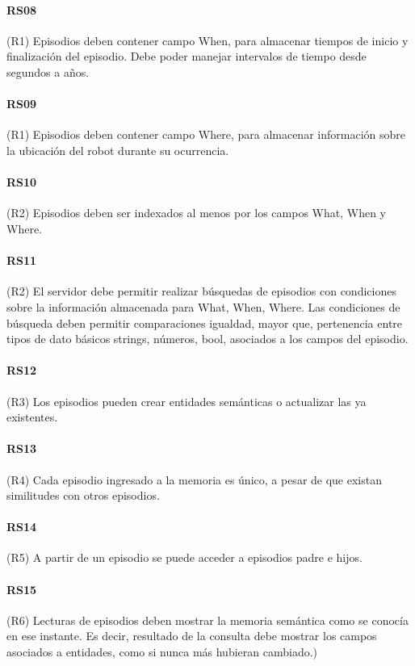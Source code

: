 \paragraph{RS08}
(R1) Episodios deben contener campo When, para almacenar tiempos de inicio y finalización del episodio. Debe poder manejar intervalos de tiempo desde segundos a años.

\paragraph{RS09}
(R1) Episodios deben contener campo Where, para almacenar información sobre la ubicación del robot durante su ocurrencia.

\paragraph{RS10}
(R2) Episodios deben ser indexados al menos por los campos What, When y Where.

\paragraph{RS11}
(R2) El servidor debe permitir realizar búsquedas de episodios con condiciones sobre la información almacenada para What, When, Where. Las condiciones de búsqueda deben permitir comparaciones {igualdad, mayor que, pertenencia} entre tipos de dato básicos {strings, números, bool}, asociados a los campos del episodio.

\paragraph{RS12}
(R3) Los episodios pueden crear entidades semánticas o actualizar las ya existentes.

\paragraph{RS13}
(R4)  Cada episodio ingresado a la memoria es único, a pesar de que existan similitudes con otros episodios.

\paragraph{RS14}
(R5) A partir de un episodio se puede acceder a episodios padre e hijos.

\paragraph{RS15}
(R6)  Lecturas de episodios deben mostrar la memoria semántica como se conocía en ese instante. Es decir, resultado de la consulta debe mostrar los campos asociados a entidades, como si nunca más hubieran cambiado.)

